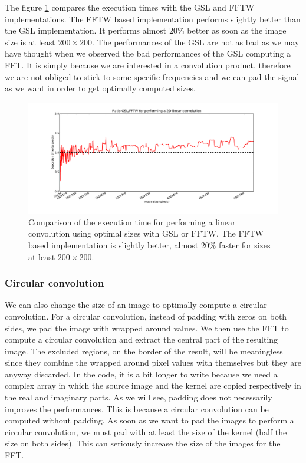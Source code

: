 \documentclass[a4paper,10pt,twoside]{article}
\begin{document}
The figure \ref{fig:benchmark_linear_convolution_compare.pdf} compares the execution times with the GSL and FFTW implementations. The FFTW based implementation performs slightly better than the GSL implementation. It performs almost $20\%$ better as soon as the image size is at least $200 \times 200$. The performances of the GSL are not as bad as we may have thought when we observed the bad performances of the GSL computing a FFT. It is simply because we are interested in a convolution product, therefore we are not obliged to stick to some specific frequencies and we can pad the signal as we want in order to get optimally computed sizes.

\begin{figure}[htbp]
\center \includegraphics[width=0.85\linewidth]{../Images/benchmark_linear_convolution_compare.pdf}
\caption{\label{fig:benchmark_linear_convolution_compare.pdf}Comparison of the execution time for performing a linear convolution using optimal sizes with GSL or FFTW. The FFTW based implementation is slightly better, almost $20\%$ faster for sizes at least $200\times 200$.}
\end{figure}


\subsubsection{Circular convolution}

We can also change the size of an image to optimally compute a circular convolution. For a circular convolution, instead of padding with zeros on both sides, we pad the image with wrapped around values. We then use the FFT to compute a circular convolution and extract the central part of the resulting image. The excluded regions, on the border of the result, will be meaningless since they combine the wrapped around pixel values with themselves but they are anyway discarded. In the code, it is a bit longer to write because we need a complex array in which the source image and the kernel are copied respectively in the real and imaginary parts. As we will see, padding does not necessarily improves the performances. This is because a circular convolution can be computed without padding. As soon as we want to pad the images to perform a circular convolution, we must pad with at least the size of the kernel (half the size on both sides). This can seriously increase the size of the images for the FFT.\\
\end{document}
